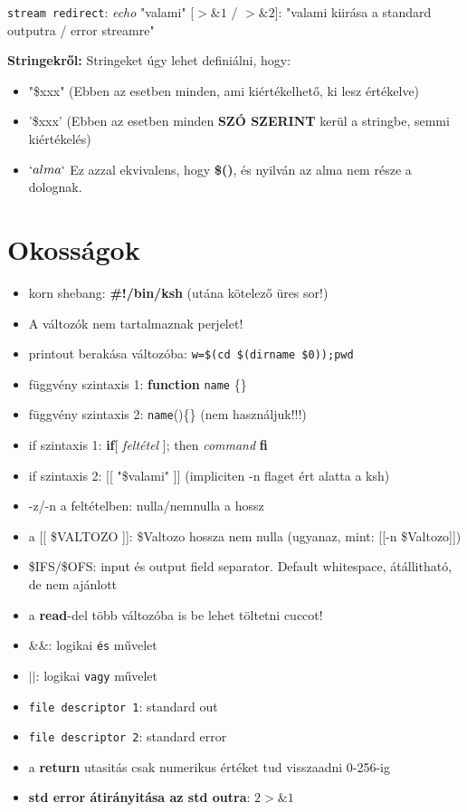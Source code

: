 \documentclass{article}
\begin{document}
\texttt{stream redirect}: \textit{echo} "valami" [$>\&1$ / $>\&2$]: "valami kiirása a standard outputra / error streamre" 

\textbf{Stringekről:} Stringeket úgy lehet definiálni, hogy:
\begin{itemize}
	\item "\$xxx" (Ebben az esetben minden, ami kiértékelhető, ki lesz értékelve)
	\item '\$xxx' (Ebben az esetben minden \textbf{SZÓ SZERINT} kerül a stringbe, semmi kiértékelés)
	\item $`alma`$ Ez azzal ekvivalens, hogy \textbf{\$()}, és nyilván az alma nem része a dolognak.
\end{itemize}


\newpage
\section{Okosságok}
\begin{itemize}
	\item korn shebang: \textbf{\#!/bin/ksh} (utána kötelező üres sor!)
	\item A változók nem tartalmaznak perjelet!
	\item printout berakása változóba: \texttt{w=\$(cd \$(dirname \$0));pwd}
	\item függvény szintaxis 1: \textbf{function} \texttt{name} \{\}
	\item függvény szintaxis 2: \texttt{name}()\{\} (nem használjuk!!!)
	\item if szintaxis 1: \textbf{if}[ \textit{feltétel} ]; then \textit{command} \textbf{fi}
	\item if szintaxis 2: [[ "\$valami" ]] (impliciten -n flaget ért alatta a ksh)
	\item -z/-n a feltételben: nulla/nemnulla a hossz
	\item a [[ \$VALTOZO ]]: \$Valtozo hossza nem nulla (ugyanaz, mint: [[-n \$Valtozo]])
	\item \$IFS/\$OFS: input és output field separator. Default whitespace, átállitható, de nem ajánlott
	\item a \textbf{read}-del több változóba is be lehet töltetni cuccot!
	\item \&\&: logikai \texttt{és} művelet
	\item $||$: logikai \texttt{vagy} művelet
	\item \texttt{file descriptor 1}: standard out
	\item \texttt{file descriptor 2}: standard error
	\item a \textbf{return} utasitás csak numerikus értéket tud visszaadni 0-256-ig
	\item \textbf{std error átirányitása az std outra}: \textit{$2>\&1$}
	
\end{itemize}
\end{document}
